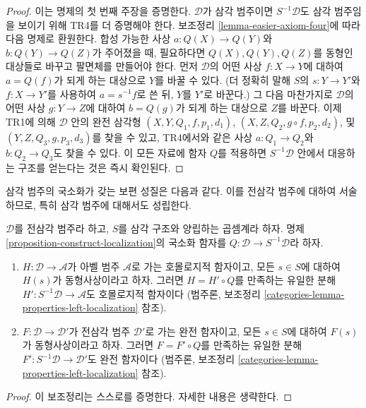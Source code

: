 \begin{proof}
\medskip\noindent
이는 명제의 첫 번째 주장을 증명한다. $\mathcal{D}$가 삼각 범주이면
$S^{-1}\mathcal{D}$도 삼각 범주임을 보이기 위해 TR4를 더 증명해야 한다.
보조정리 \ref{lemma-easier-axiom-four}에 따라 다음 명제로 환원한다.
합성 가능한 사상 $a : Q(X) \to Q(Y)$와 $b : Q(Y) \to Q(Z)$가
주어졌을 때, 필요하다면 $Q(X), Q(Y), Q(Z)$를 동형인 대상들로 바꾸고
팔면체를 만들어야 한다. 먼저 $\mathcal{D}$의 어떤 사상
$f : X \to Y$에 대하여 $a = Q(f)$가 되게 하는 대상으로 $Y$를
바꿀 수 있다. (더 정확히 말해 $S$의 $s : Y \to Y'$와
$f : X \to Y'$를 사용하여 $a = s^{-1}f$로 쓴 뒤, $Y$를 $Y'$로
바꾼다.) 그 다음 마찬가지로 $\mathcal{D}$의 어떤 사상
$g : Y \to Z$에 대하여 $b = Q(g)$가 되게 하는 대상으로 $Z$를 바꾼다.
이제 TR1에 의해 $\mathcal{D}$ 안의 완전 삼각형
$(X, Y, Q_1, f, p_1, d_1)$,
$(X, Z, Q_2, g \circ f, p_2, d_2)$, 및
$(Y, Z, Q_3, g, p_3, d_3)$를 찾을 수 있고, TR4에서와 같은 사상
$a : Q_1 \to Q_2$와 $b : Q_2 \to Q_3$도 찾을 수 있다.
이 모든 자료에 함자 $Q$를 적용하면 $S^{-1}\mathcal{D}$ 안에서
대응하는 구조를 얻는다는 것은 즉시 확인된다.
\end{proof}

\noindent
삼각 범주의 국소화가 갖는 보편 성질은 다음과 같다. 이를 전삼각 범주에
대하여 서술하므로, 특히 삼각 범주에 대해서도 성립한다.

\begin{lemma}
\label{lemma-universal-property-localization}
$\mathcal{D}$를 전삼각 범주라 하고, $S$를 삼각 구조와 양립하는
곱셈계라 하자. 명제 \ref{proposition-construct-localization}의 국소화
함자를 $Q : \mathcal{D} \to S^{-1}\mathcal{D}$라 하자.
\begin{enumerate}
\item $H : \mathcal{D} \to \mathcal{A}$가 아벨 범주 $\mathcal{A}$로
가는 호몰로지적 함자이고, 모든 $s \in S$에 대하여 $H(s)$가
동형사상이라고 하자. 그러면 $H = H' \circ Q$를 만족하는 유일한 분해
$H' : S^{-1}\mathcal{D} \to \mathcal{A}$도 호몰로지적 함자이다
(범주론, 보조정리 \ref{categories-lemma-properties-left-localization} 참조).
\item $F : \mathcal{D} \to \mathcal{D}'$가 전삼각 범주
$\mathcal{D}'$로 가는 완전 함자이고, 모든 $s \in S$에 대하여
$F(s)$가 동형사상이라고 하자. 그러면 $F = F' \circ Q$를 만족하는
유일한 분해 $F' : S^{-1}\mathcal{D} \to \mathcal{D}'$도 완전 함자이다
(범주론, 보조정리 \ref{categories-lemma-properties-left-localization} 참조).
\end{enumerate}
\end{lemma}

\begin{proof}
이 보조정리는 스스로를 증명한다. 자세한 내용은 생략한다.
\end{proof}

